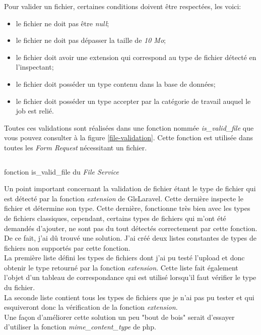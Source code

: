 \documentclass[
    iai, %
    il, %
]{heig-tb}
\begin{document}
Pour valider un fichier, certaines conditions doivent être respectées, les voici:
\begin{itemize}
    \item le fichier ne doit pas être \emph{null};
    \item le fichier ne doit pas dépasser la taille de \emph{10 Mo};
    \item le fichier doit avoir une extension qui correspond au type de fichier détecté en l'inspectant;
    \item le fichier doit posséder un type contenu dans la base de données;
    \item le fichier doit posséder un type accepter par la catégorie de travail auquel le job est relié.
\end{itemize}

Toutes ces validations sont réalisées dans une fonction nommée \emph{is\_valid\_file} que vous pouvez consulter à la figure \ref{file-validation}. Cette fonction est utilisée dans toutes les \emph{Form Request} nécessitant un fichier.

\begin{listing}[H]
    \inputminted{php}{assets/code/FileValidation.php}
    \caption{fonction is\_valid\_file du \emph{File Service} \label{file-validation}}
\end{listing}

Un point important concernant la validation de fichier étant le type de fichier qui est détecté par la fonction \emph{extension} de Gls{Laravel}. Cette dernière inspecte le fichier et détermine son type. Cette dernière, fonctionne très bien avec les types de fichiers classiques, cependant, certains types de fichiers qui m'ont été demandés d'ajouter, ne sont pas du tout détectés correctement par cette fonction. \\
De ce fait, j'ai dû trouvé une solution. J'ai créé deux listes constantes de types de fichiers non supportés par cette fonction. \\
La première liste défini les types de fichiers dont j'ai pu testé l'upload et donc obtenir le type retourné par la fonction \emph{extension}. Cette liste fait également l'objet d'un tableau de correspondance qui est utilisé lorsqu'il faut vérifier le type du fichier. \\
La seconde liste contient tous les types de fichiers que je n'ai pas pu tester et qui esquiveront donc la vérification de la fonction \emph{extension}. \\
Une façon d'améliorer cette solution un peu "bout de bois" serait d'essayer d'utiliser la fonction \emph{mime\_content\_type} de \Gls{php}.
\end{document}
